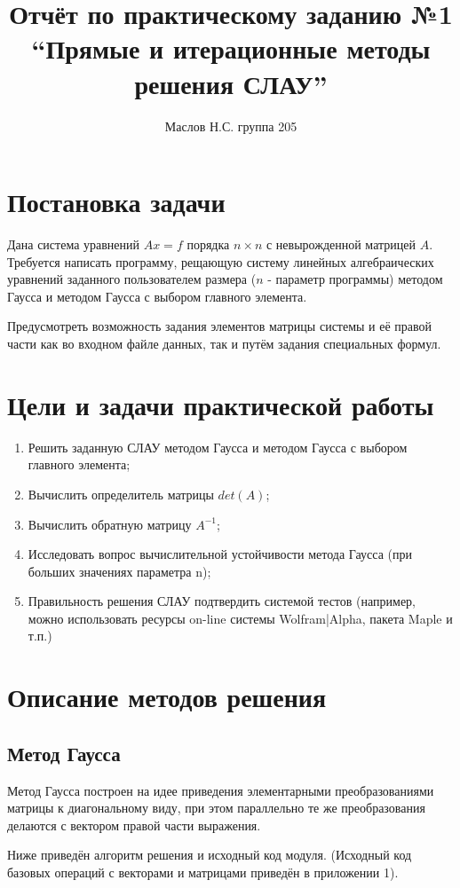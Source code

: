 \documentclass[a4paper,11pt]{report}
\title{Отчёт по практическому заданию №1 ``Прямые и итерационные методы решения СЛАУ''}
\author{Маслов Н.С. группа 205}
\begin{document}



\section*{Постановка задачи}
Дана система уравнений $Ax=f$ порядка $n\times n$ с невырожденной матрицей $A$. Требуется написать
программу, рещающую систему линейных алгебраических уравнений заданного пользователем размера ($n$ - параметр программы)
методом Гаусса и методом Гаусса с выбором главного элемента.

Предусмотреть возможность задания элементов матрицы системы и её правой части как во входном файле данных, так и путём
задания специальных формул.

\section*{Цели и задачи практической работы}
\begin{enumerate}
 \item Решить заданную СЛАУ методом Гаусса и методом Гаусса с выбором главного элемента;
 \item Вычислить определитель матрицы $det(A)$;
 \item Вычислить обратную матрицу $A^{-1}$;
 \item Исследовать вопрос вычислительной устойчивости метода Гаусса (при больших значениях параметра n);
 \item Правильность решения СЛАУ подтвердить системой тестов (например, можно использовать ресурсы on-line
 системы Wolfram|Alpha, пакета Maple и т.п.)
\end{enumerate}

\section*{Описание методов решения}
\subsection*{Метод Гаусса}
Метод Гаусса построен на идее приведения элементарными преобразованиями матрицы к диагональному виду, при этом параллельно
те же преобразования делаются с вектором правой части выражения.

Ниже приведён алгоритм решения и исходный код модуля. (Исходный код базовых операций с векторами и матрицами приведён
в приложении 1).
\end{document}
